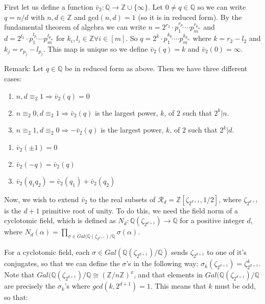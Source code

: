 \documentclass[12pt]{dalthesis}
\begin{document}
First let us define a function $\bar{v}_2 :\mathbb{Q} \rightarrow \mathbb{Z} \cup \{ \infty \}$. Let $0 \neq q \in \mathbb{Q}$ so we can write $q = n/d$ with $n, d \in \mathbb{Z}$ and gcd$(n, d) = 1$ (so it is in reduced form). By the fundamental theorem of algebra we can write $n = 2^{r_2} \cdot p^{r_{p_1}}_1 \cdots p^{r_{p_m}}_m$ and $d = 2^{l_2} \cdot p^{l_{p_1}}_1 \cdots p^{l_{p_m}}_m$ for $k_i, l_i \in \mathbb{Z} \forall i \in [m]$. So $q = 2^{k} \cdot p^{k_{p_1}}_1 \cdots p^{k_{p_m}}_m$ where $k = r_2 - l_2$ and $k_j = r_{p_j} - l_{p_j}$. This map is unique so we define $\bar{v}_2(q) = k$ and $\bar{v}_2(0) = \infty$.

Remark: Let $q \in \mathbb{Q}$ be in reduced form as above. Then we have three different cases:
\begin{enumerate}
\item $n, d \equiv_2 1 \Rightarrow \bar{v}_2(q)= 0$
\item $n \equiv_2 0, d \equiv_2 1 \Rightarrow \bar{v}_2(q)$ is the largest power, $k$, of $2$ such that $2^k|n$.
\item $n \equiv_2 1, d \equiv_2 0 \Rightarrow -\bar{v}_2(q)$ is the largest power, $k$, of $2$ such that $2^k|d$.
\end{enumerate}

\begin{proposition}

\begin{enumerate}
\item $\bar{v}_2(\pm 1) = 0$
\item $\bar{v}_2 (-q) = \bar{v}_2 (q)$
\item $\bar{v}_2(q_1q_2) = \bar{v}_2 (q_1) + \bar{v}_2 (q_2)$
\end{enumerate}
\end{proposition}

Now, we wish to extend $\bar{v}_2$ to the real subsets of $\mathcal{R}_d = \mathbb{Z}[\zeta_{2^{d+1}}, 1/2]$, where $\zeta_{2^{d+1}}$ is the $d+1$ primitive root of unity. To do this, we need the field norm of a cyclotomic field, which is defined as $N_d: \mathbb{Q}(\zeta_{2^{d+1}}) \longrightarrow \mathbb{Q}$ for a positive integer $d$, where $N_d (\alpha) = \prod_{\sigma \in Gal(\mathbb{Q}(\zeta_{2^{d+1}})/\mathbb{Q}} \sigma (\alpha)$. 

For a cyclotomic field, each $\sigma \in Gal(\mathbb{Q}(\zeta_{2^{d+1}})/\mathbb{Q})$ sends $\zeta_{2^{d+1}}$ to one of it's conjugates, so that we can define the $\sigma$'s in the following way: $\sigma_k (\zeta_{2^{d+1}}) = \zeta_{2^{d+1}}^k$. Note that $Gal(\mathbb{Q}(\zeta_{2^{d+1}})/\mathbb{Q} \cong (\mathbb{Z}/n\mathbb{Z})^x$, and that elements in $Gal(\mathbb{Q}(\zeta_{2^{d+1}})/\mathbb{Q}$ are precisely the $\sigma_k$'s where $gcd(k, 2^{d+1}) = 1$. This means that $k$ must be odd, so that:
\end{document}
